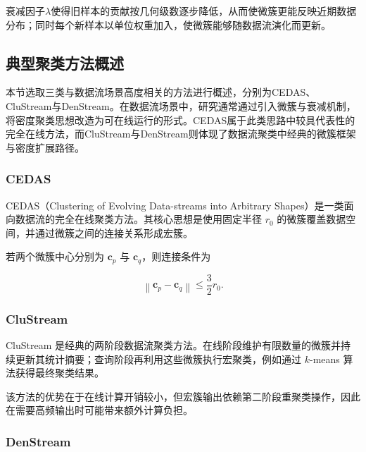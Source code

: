 \documentclass{xdupgthesis}
\begin{document}
衰减因子$\lambda$使得旧样本的贡献按几何级数逐步降低，从而使微簇更能反映近期数据分布；同时每个新样本以单位权重加入，使微簇能够随数据流演化而更新。



\subsection{典型聚类方法概述}

本节选取三类与数据流场景高度相关的方法进行概述，分别为CEDAS、CluStream与DenStream。在数据流场景中，研究通常通过引入微簇与衰减机制，将密度聚类思想改造为可在线运行的形式。CEDAS属于此类思路中较具代表性的完全在线方法，而CluStream与DenStream则体现了数据流聚类中经典的微簇框架与密度扩展路径。

\subsubsection{CEDAS}

CEDAS（Clustering of Evolving Data-streams into Arbitrary Shapes）是一类面向数据流的完全在线聚类方法。其核心思想是使用固定半径 $r_0$ 的微簇覆盖数据空间，并通过微簇之间的连接关系形成宏簇。

若两个微簇中心分别为 $\mathbf{c}_p$ 与 $\mathbf{c}_q$，则连接条件为

\begin{equation}
	\left\|
	\mathbf{c}_p-\mathbf{c}_q
	\right\|
	\le
	\frac{3}{2}r_0 .
\end{equation}



\subsubsection{CluStream}

CluStream 是经典的两阶段数据流聚类方法。在线阶段维护有限数量的微簇并持续更新其统计摘要；查询阶段再利用这些微簇执行宏聚类，例如通过 $k$-means 算法获得最终聚类结果。

该方法的优势在于在线计算开销较小，但宏簇输出依赖第二阶段重聚类操作，因此在需要高频输出时可能带来额外计算负担。



\subsubsection{DenStream}
\end{document}
